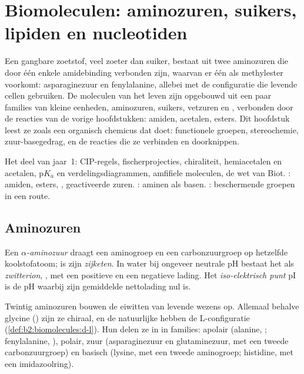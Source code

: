 \chapter{Biomoleculen: aminozuren, suikers, lipiden en nucleotiden}\label{ch:b2:biomolecules}

Een gangbare zoetstof, veel zoeter dan suiker, bestaat uit twee aminozuren die door één enkele amidebinding verbonden zijn, waarvan
er één als methylester voorkomt: asparaginezuur en fenylalanine, allebei met de configuratie die levende cellen
gebruiken. De moleculen van het leven zijn opgebouwd uit een paar families van kleine eenheden, aminozuren, suikers,
vetzuren en , verbonden door de reacties van de vorige hoofdstukken: amiden, acetalen, esters. Dit
hoofdstuk leest ze zoals een organisch chemicus dat doet: functionele groepen, stereochemie,
zuur-basegedrag, en de reacties die ze verbinden en doorknippen.

\begin{recall}
Het deel van jaar~1: CIP-regels, fischerprojecties, chiraliteit, hemiacetalen en acetalen, $\mathrm pK_a$
en verdelingsdiagrammen, amfifiele moleculen, de wet van Biot. : amiden,
esters, , geactiveerde zuren. : aminen als basen.
: beschermende groepen in een route.
\end{recall}

\section{Aminozuren}

\begin{definition}[Aminozuren]\label{def:b2:biomolecules:amino-acid}
Een \emph{$\alpha$-aminozuur}  draagt een
aminogroep en een carbonzuurgroep op hetzelfde koolstofatoom;  is zijn \emph{zijketen}.
In water bij ongeveer neutrale pH bestaat het als \emph{zwitterion},
, met een positieve en een negatieve lading. Het \emph{iso-elektrisch
punt} pI is de pH waarbij zijn gemiddelde nettolading nul is.
\end{definition}

Twintig aminozuren bouwen de eiwitten van levende wezens op. Allemaal behalve glycine () zijn ze chiraal, en
de natuurlijke hebben de L-configuratie (\cref{def:b2:biomolecules:d-l}). Hun  delen ze in
in families: apolair (alanine, ; fenylalanine, ), polair, zuur
(asparaginezuur en glutaminezuur, met een tweede carbonzuurgroep) en basisch (lysine, met een tweede
aminogroep; histidine, met een imidazoolring).

